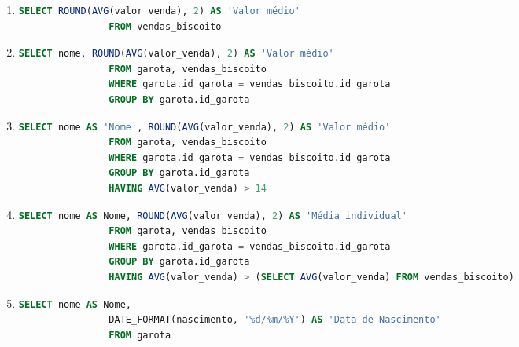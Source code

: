 \documentclass{article}
\begin{document}
\begin{enumerate}[label=\alph*.]
\begin{enumerate}[label=\roman*., labelsep=0.5em, leftmargin=*]
        \item 
        \begin{adjustwidth}{1em}{0pt}
            \begin{lstlisting}[language=SQL]
                SELECT ROUND(AVG(valor_venda), 2) AS 'Valor médio'
                FROM vendas_biscoito
            \end{lstlisting}
        \end{adjustwidth}

        \item 
        \begin{adjustwidth}{1em}{0pt}
            \begin{lstlisting}[language=SQL]
                SELECT nome, ROUND(AVG(valor_venda), 2) AS 'Valor médio'
                FROM garota, vendas_biscoito
                WHERE garota.id_garota = vendas_biscoito.id_garota
                GROUP BY garota.id_garota
            \end{lstlisting}
        \end{adjustwidth}

        \item 
        \begin{adjustwidth}{1em}{0pt}
            \begin{lstlisting}[language=SQL]
                SELECT nome AS 'Nome', ROUND(AVG(valor_venda), 2) AS 'Valor médio'
                FROM garota, vendas_biscoito
                WHERE garota.id_garota = vendas_biscoito.id_garota
                GROUP BY garota.id_garota
                HAVING AVG(valor_venda) > 14
            \end{lstlisting}
        \end{adjustwidth}

        \item 
        \begin{adjustwidth}{1em}{0pt}
            \begin{lstlisting}[language=SQL]
                SELECT nome AS Nome, ROUND(AVG(valor_venda), 2) AS 'Média individual'
                FROM garota, vendas_biscoito
                WHERE garota.id_garota = vendas_biscoito.id_garota
                GROUP BY garota.id_garota
                HAVING AVG(valor_venda) > (SELECT AVG(valor_venda) FROM vendas_biscoito)                
            \end{lstlisting}
        \end{adjustwidth}

        \item 
        \begin{adjustwidth}{1em}{0pt}
            \begin{lstlisting}[language=SQL]
                SELECT nome AS Nome, 
                DATE_FORMAT(nascimento, '%d/%m/%Y') AS 'Data de Nascimento'
                FROM garota
            \end{lstlisting}
        \end{adjustwidth}


\end{enumerate}
\end{enumerate}
\end{document}
